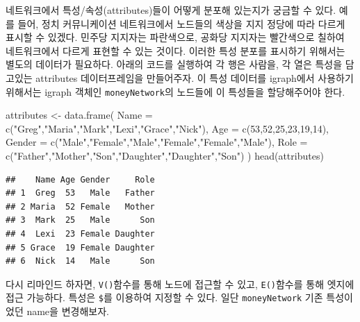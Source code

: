 \documentclass[
]{book}
\newenvironment{Shaded}{\begin{snugshade}}{\end{snugshade}}
\newcommand{\AttributeTok}[1]{\textcolor[rgb]{0.77,0.63,0.00}{#1}}
\newcommand{\DecValTok}[1]{\textcolor[rgb]{0.00,0.00,0.81}{#1}}
\newcommand{\FunctionTok}[1]{\textcolor[rgb]{0.00,0.00,0.00}{#1}}
\newcommand{\NormalTok}[1]{#1}
\newcommand{\OtherTok}[1]{\textcolor[rgb]{0.56,0.35,0.01}{#1}}
\newcommand{\StringTok}[1]{\textcolor[rgb]{0.31,0.60,0.02}{#1}}
\begin{document}
네트워크에서 특성/속성(attributes)들이 어떻게 분포해 있는지가 궁금할 수 있다. 예를 들어, 정치 커뮤니케이션 네트워크에서 노드들의 색상을 지지 정당에 따라 다르게 표시할 수 있겠다. 민주당 지지자는 파란색으로, 공화당 지지자는 빨간색으로 칠하여 네트워크에서 다르게 표현할 수 있는 것이다. 이러한 특성 분포를 표시하기 위해서는 별도의 데이터가 필요하다. 아래의 코드를 실행하여 각 행은 사람을, 각 열은 특성을 담고있는 attributes 데이터프레임을 만들어주자. 이 특성 데이터를 igraph에서 사용하기 위해서는 igraph 객체인 \texttt{moneyNetwork}의 노드들에 이 특성들을 할당해주어야 한다.

\begin{Shaded}
\begin{Highlighting}[]
\NormalTok{attributes }\OtherTok{\textless{}{-}} \FunctionTok{data.frame}\NormalTok{(}
  \AttributeTok{Name =} \FunctionTok{c}\NormalTok{(}\StringTok{"Greg"}\NormalTok{,}\StringTok{"Maria"}\NormalTok{,}\StringTok{"Mark"}\NormalTok{,}\StringTok{"Lexi"}\NormalTok{,}\StringTok{"Grace"}\NormalTok{,}\StringTok{"Nick"}\NormalTok{),}
  \AttributeTok{Age =} \FunctionTok{c}\NormalTok{(}\DecValTok{53}\NormalTok{,}\DecValTok{52}\NormalTok{,}\DecValTok{25}\NormalTok{,}\DecValTok{23}\NormalTok{,}\DecValTok{19}\NormalTok{,}\DecValTok{14}\NormalTok{),}
  \AttributeTok{Gender =} \FunctionTok{c}\NormalTok{(}\StringTok{"Male"}\NormalTok{,}\StringTok{"Female"}\NormalTok{,}\StringTok{"Male"}\NormalTok{,}\StringTok{"Female"}\NormalTok{,}\StringTok{"Female"}\NormalTok{,}\StringTok{"Male"}\NormalTok{),}
  \AttributeTok{Role =} \FunctionTok{c}\NormalTok{(}\StringTok{"Father"}\NormalTok{,}\StringTok{"Mother"}\NormalTok{,}\StringTok{"Son"}\NormalTok{,}\StringTok{"Daughter"}\NormalTok{,}\StringTok{"Daughter"}\NormalTok{,}\StringTok{"Son"}\NormalTok{)}
\NormalTok{)}
\FunctionTok{head}\NormalTok{(attributes)}
\end{Highlighting}
\end{Shaded}

\begin{verbatim}
##    Name Age Gender     Role
## 1  Greg  53   Male   Father
## 2 Maria  52 Female   Mother
## 3  Mark  25   Male      Son
## 4  Lexi  23 Female Daughter
## 5 Grace  19 Female Daughter
## 6  Nick  14   Male      Son
\end{verbatim}

다시 리마인드 하자면, \texttt{V()}함수를 통해 노드에 접근할 수 있고, \texttt{E()}함수를 통해 엣지에 접근 가능하다. 특성은 \texttt{\$}를 이용하여 지정할 수 있다. 일단 \texttt{moneyNetwork} 기존 특성이었던 name을 변경해보자.
\end{document}
